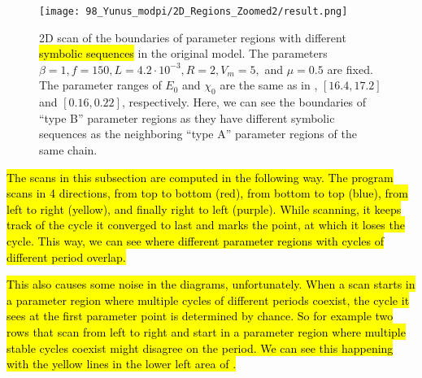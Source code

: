 \begin{figure}
	\centering
	\texttt{[image: 98\_Yunus\_modpi/2D\_Regions\_Zoomed2/result.png]}
	\caption[2D scan of the boundaries of parameter regions with different symbolic sequences in the original model]{
		2D scan of the boundaries of parameter regions with different \hl{symbolic sequences} in the original model.
		The parameters $\beta = 1, f = 150, L = 4.2 \cdot 10^{-3}, R = 2, V_m = 5,$ and $\mu = 0.5$ are fixed.
		The parameter ranges of $E_0$ and $\chi_0$ are the same as in , $[16.4, 17.2]$ and $[0.16, 0.22]$, respectively.
		Here, we can see the boundaries of ``type B'' parameter regions as they have different symbolic sequences as the neighboring ``type A'' parameter regions of the same chain.\footnotemark[1]
	}
	\label{fig:etup.og.overlapping.regions.zoomed}
\end{figure}

\hl{
	The scans in this subsection are computed in the following way.
	The program scans in 4 directions, from top to bottom (red), from bottom to top (blue), from left to right (yellow), and finally right to left (purple).
	While scanning, it keeps track of the cycle it converged to last and marks the point, at which it loses the cycle.
	This way, we can see where different parameter regions with cycles of different period overlap.
}

\hl{
	This also causes some noise in the diagrams, unfortunately.
	When a scan starts in a parameter region where multiple cycles of different periods coexist, the cycle it sees at the first parameter point is determined by chance.
	So for example two rows that scan from left to right and start in a parameter region where multiple stable cycles coexist might disagree on the period.
	We can see this happening with the yellow lines in the lower left area of .
}
